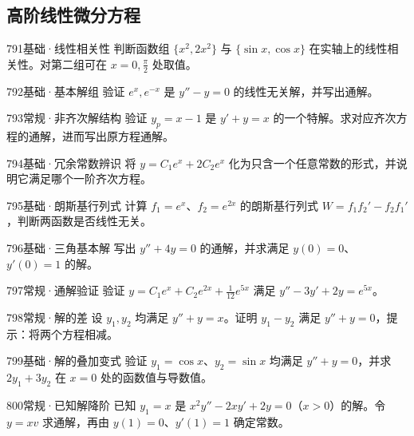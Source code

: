 \subsection{高阶线性微分方程}
\begin{exercise}{791}{基础·线性相关性}
判断函数组 $\{x^2,2x^2\}$ 与 $\{\sin x,\cos x\}$ 在实轴上的线性相关性。对第二组可在 $x=0,\frac{\pi}{2}$ 处取值。
\end{exercise}
\begin{exercise}{792}{基础·基本解组}
验证 $e^x,e^{-x}$ 是 $y''-y=0$ 的线性无关解，并写出通解。
\end{exercise}
\begin{exercise}{793}{常规·非齐次解结构}
验证 $y_p=x-1$ 是 $y'+y=x$ 的一个特解。求对应齐次方程的通解，进而写出原方程通解。
\end{exercise}
\begin{exercise}{794}{基础·冗余常数辨识}
将 $y=C_1e^x+2C_2e^x$ 化为只含一个任意常数的形式，并说明它满足哪个一阶齐次方程。
\end{exercise}
\begin{exercise}{795}{基础·朗斯基行列式}
计算 $f_1=e^x$、$f_2=e^{2x}$ 的朗斯基行列式 $W=f_1f_2'-f_2f_1'$，判断两函数是否线性无关。
\end{exercise}
\begin{exercise}{796}{基础·三角基本解}
写出 $y''+4y=0$ 的通解，并求满足 $y(0)=0$、$y'(0)=1$ 的解。
\end{exercise}
\begin{exercise}{797}{常规·通解验证}
验证 $y=C_1e^x+C_2e^{2x}+\frac1{12}e^{5x}$ 满足 $y''-3y'+2y=e^{5x}$。
\end{exercise}
\begin{exercise}{798}{常规·解的差}
设 $y_1,y_2$ 均满足 $y''+y=x$。证明 $y_1-y_2$ 满足 $y''+y=0$，提示：将两个方程相减。
\end{exercise}
\begin{exercise}{799}{基础·解的叠加变式}
验证 $y_1=\cos x$、$y_2=\sin x$ 均满足 $y''+y=0$，并求 $2y_1+3y_2$ 在 $x=0$ 处的函数值与导数值。
\end{exercise}
\begin{exercise}{800}{常规·已知解降阶}
已知 $y_1=x$ 是 $x^2y''-2xy'+2y=0$（$x>0$）的解。令 $y=xv$ 求通解，再由 $y(1)=0$、$y'(1)=1$ 确定常数。
\end{exercise}
